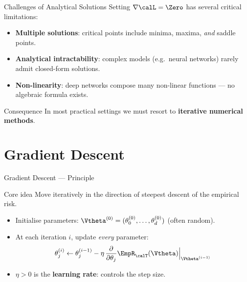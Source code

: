 \begin{frame}{Challenges of Analytical Solutions}
  Setting $\nabla \calL = \Zero$ has several \alert{critical limitations}:

  \vspace{.4em}
  \begin{itemize}
    \item \textbf{Multiple solutions}: critical points include minima, maxima, \emph{and} saddle points.
    \item \textbf{Analytical intractability}: complex models (e.g.\ neural networks) rarely admit closed-form solutions.
    \item \textbf{Non-linearity}: deep networks compose many non-linear functions — no algebraic formula exists.
  \end{itemize}

  \vspace{.5em}
  \begin{alertblock}{Consequence}
    In most practical settings we must resort to \textbf{iterative numerical methods}.
  \end{alertblock}
\end{frame}

\section{Gradient Descent}

\begin{frame}{Gradient Descent — Principle}
  \begin{block}{Core idea}
    Move iteratively in the direction of \alert{steepest descent} of the empirical risk.
  \end{block}

  \vspace{.4em}
  \begin{itemize}
    \item Initialise parameters: $\Vtheta^{(0)} = (\theta_0^{(0)}, \ldots, \theta_d^{(0)})$ (often random).
    \item At each iteration $i$, update \emph{every} parameter:
      \[
        \theta_j^{(i)} \leftarrow \theta_j^{(i-1)}
        - \eta\,\frac{\partial}{\partial \theta_j}
          \EmpR_{\calT}(\Vtheta)\Big|_{\Vtheta^{(i-1)}}
      \]
    \item $\eta > 0$ is the \textbf{learning rate}: controls the step size.
  \end{itemize}
\end{frame}

